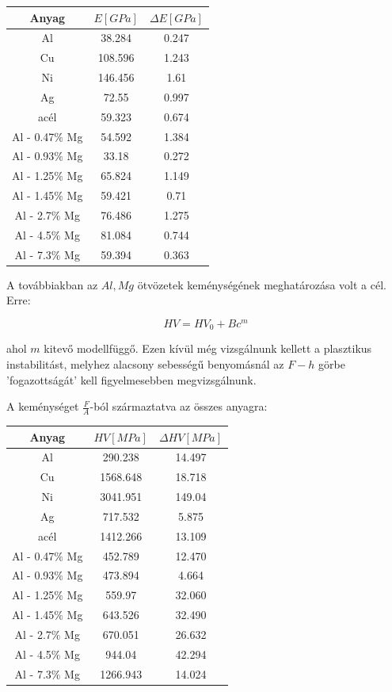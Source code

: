 \documentclass[a4paper,12pt]{article}
\begin{document}
\begin{center}
\begin{tabular}{|c|c|c|}
\hline
Anyag & $E [GPa]$ & $\Delta E [GPa]$ \\
\hline
Al &38.284 &0.247\\
\hline
Cu &108.596 &1.243\\
\hline
Ni &146.456 &1.61\\
\hline
Ag &72.55 &0.997\\
\hline
acél &59.323 &0.674\\
\hline
Al - 0.47$\%$ Mg &54.592& 1.384\\
\hline
Al - 0.93$\%$ Mg &33.18 &0.272\\
\hline
Al - 1.25$\%$ Mg &65.824& 1.149\\
\hline
Al - 1.45$\%$ Mg & 59.421& 0.71\\
\hline
Al - 2.7$\%$ Mg &76.486& 1.275\\
\hline
Al - 4.5$\%$ Mg &81.084& 0.744\\
\hline
Al - 7.3$\%$ Mg &59.394& 0.363\\
\hline
\end{tabular}
\end{center}

\par A továbbiakban az $Al, Mg$ ötvözetek keménységének meghatározása volt a cél. Erre:

\begin{equation*}
HV = HV_{0} + Bc^{m}
\end{equation*}

\par ahol $m$ kitevő modellfüggő. Ezen kívül még vizsgálnunk kellett a plasztikus instabilitást, melyhez alacsony sebességű benyomásnál az $F-h$ görbe 'fogazottságát' kell figyelmesebben megvizsgálnunk. 

\par A keménységet $\frac{F}{A}$-ból származtatva az összes anyagra:

\begin{center}
\begin{tabular}{|c|c|c|}
\hline
Anyag & $HV [MPa]$ & $\Delta HV [MPa]$ \\
\hline
Al & 290.238 & 14.497\\
\hline
Cu & 1568.648 & 18.718\\
\hline
Ni & 3041.951&  149.04\\
\hline
Ag & 717.532 & 5.875\\
\hline
acél & 1412.266 & 13.109\\
\hline
Al - 0.47$\%$ Mg & 452.789&  12.470\\
\hline
Al - 0.93$\%$ Mg & 473.894 & 4.664\\
\hline
Al - 1.25$\%$ Mg & 559.97&  32.060\\
\hline
Al - 1.45$\%$ Mg & 643.526&  32.490\\
\hline
Al - 2.7$\%$ Mg & 670.051 & 26.632\\
\hline
Al - 4.5$\%$ Mg & 944.04 & 42.294\\
\hline
Al - 7.3$\%$ Mg & 1266.943 & 14.024\\
\hline
\end{tabular}
\end{center}
\end{document}
